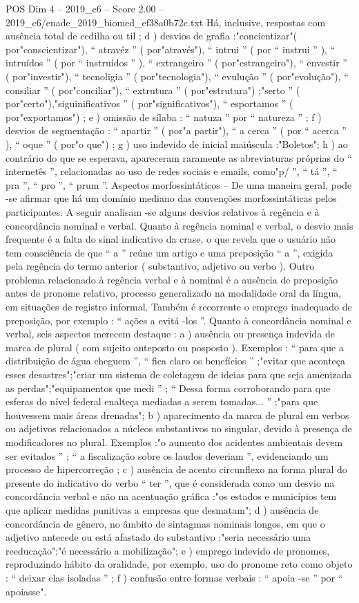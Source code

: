 \begin{textsample}{POS Dim 4 – 2019\_c6 – Score 2.00 – 2019\_c6/enade\_2019\_biomed\_ef38a0b72c.txt}
Há, inclusive, respostas com ausência total de cedilha ou til ; d ) desvios de grafia :"concientizar"( por"conscientizar"), “ atravéz ” ( por"através"), “ intrui ” ( por “ instrui ” ), “ intruídos ” ( por “ instruídos ” ), “ extrangeiro ” ( por"estrangeiro"), “ envestir ” ( por"investir"), “ tecnoligia ” ( por"tecnologia"), “ evulução ” ( por"evolução"), “ consiliar ” ( por"conciliar"), “ extrutura ” ( por"estrutura") ;"serto ” ( por"certo"),"siguinificativos ” ( por"significativos"), “ esportamos ” ( por"exportamos") ; e ) omissão de sílaba : “ natuza ” por “ natureza ” ; f ) desvios de segmentação : “ apartir ” ( por"a partir"), “ a cerca ” ( por “ acerca ” ), “ oque ” ( por"o que") ; g ) uso indevido de inicial maiúscula :"Boletos"; h ) ao contrário do que se esperava, apareceram raramente as abreviaturas próprias do “ internetês ”, relacionadas ao uso de redes sociais e emails, como"p/ ”, “ tá ”, “ pra ”, “ pro ”, “ prum ”.
Aspectos morfossintáticos – De uma maneira geral, pode -se afirmar que há um domínio mediano das convenções morfossintáticas pelos participantes.
A seguir analisam -se alguns desvios relativos à regência e à concordância nominal e verbal.
Quanto à regência nominal e verbal, o desvio mais frequente é a falta do sinal indicativo da crase, o que revela que o usuário não tem consciência de que “ a ” reúne um artigo e uma preposição “ a ”, exigida pela regência do termo anterior ( substantivo, adjetivo ou verbo ).
Outro problema relacionado à regência verbal e à nominal é a ausência de preposição antes de pronome relativo, processo generalizado na modalidade oral da língua, em situações de registro informal.
Também é recorrente o emprego inadequado de preposição, por exemplo : “ ações a evitá -los ”.
Quanto à concordância nominal e verbal, seis aspectos merecem destaque : a ) ausência ou presença indevida de marca de plural ( com sujeito anteposto ou posposto ).
Exemplos : “ para que a distribuição de água cheguem ”, “ fica claro os benefícios ” ;"evitar que aconteça esses desastres";"criar um sistema de coletagem de ideias para que seja amenizada as perdas";"equipamentos que medi ” ; “ Dessa forma corroborando para que esferas do nível federal enalteça mediadas a serem tomadas... ” ;"para que houvessem mais áreas drenadas"; b ) aparecimento da marca de plural em verbos ou adjetivos relacionados a núcleos substantivos no singular, devido à presença de modificadores no plural.
Exemplos :"o aumento dos acidentes ambientais devem ser evitados ” ; “ a fiscalização sobre os laudos deveriam ”, evidenciando um processo de hipercorreção ; c ) ausência de acento circunflexo na forma plural do presente do indicativo do verbo “ ter ”, que é considerada como um desvio na concordância verbal e não na acentuação gráfica :"os estados e municípios tem que aplicar medidas punitivas a empresas que desmatam"; d ) ausência de concordância de gênero, no âmbito de sintagmas nominais longos, em que o adjetivo antecede ou está afastado do substantivo :"seria necessário uma reeducação";"é necessário a mobilização"; e ) emprego indevido de pronomes, reproduzindo hábito da oralidade, por exemplo, uso do pronome reto como objeto : “ deixar elas isoladas ” ; f ) confusão entre formas verbais : “ apoia -se ” por “ apoiasse".

\end{textsample}
